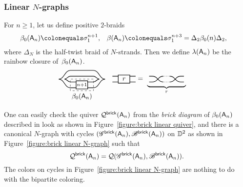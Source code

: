 \subsubsection{Linear \texorpdfstring{$N$-graphs}{N-graphs}}\label{sec:linear}
For $n\ge 1$, let us define positive $2$-braids
\begin{align*}
\beta_0(\dynA_n)&\colonequals \sigma_1^{n+1},&
\beta(\dynA_n) &\colonequals \sigma_1^{n+3} = \Delta_2 \beta_0(n) \Delta_2,
\end{align*}
where $\Delta_N$ is the half-twist braid of $N$-strands.
Then we define $\lambda(\mathsf{A}_n)$ be the rainbow closure of~$\beta_0(\mathsf{A}_n)$.
\begin{align*}
&\begin{tikzpicture}[baseline=-.5ex,scale=0.6]
\draw[thick] (-0.5,-0.25) -- (-1,-0.25) to[out=180,in=0] (-1.5,0) to[out=0,in=180] (-1,0.25) -- (1,0.25) to[out=0,in=180] (1.5,0) to[out=180,in=0] (1,-0.25) -- (0.5, -0.25);
\draw[thick] (-0.5,-0.75) -- (-1,-0.75) to[out=180,in=0] (-2,0) to[out=0,in=180] (-1,0.75) -- (1,0.75) to[out=0,in=180] (2,0) to[out=180,in=0] (1,-0.75) -- (0.5,-0.75);
\draw[thick] (-0.5,-0.85) rectangle (0.5,-0.15);
\draw (0,-0.5) node {$\scriptstyle n+1$};
\draw[dashed] (-1,-1) rectangle (1,0) (0,-1) node[below] {$\beta_0(\dynA_n)$};
\end{tikzpicture}&
\begin{tikzpicture}[baseline=-.5ex,scale=0.6]
\draw[thick] (-1.5,-0.25) -- (-1,-0.25) (-1.5,0.25) -- (-1,0.25) (0.5,-0.25) -- (0,-0.25) (0.5,0.25) -- (0,0.25) (-1,-0.35) rectangle node {$r$} (0,0.35);
\end{tikzpicture}&=
\begin{tikzpicture}[baseline=-.5ex,scale=0.6]
\draw[thick, rounded corners] (-1.5,0.25) -- (-1,0.25) -- (-0.5, -0.25) -- (-0.3, -0.25) (-1.5,-0.25) -- (-1,-0.25) -- (-0.5, 0.25) -- (-0.3, 0.25) (1.5,0.25) -- (1,0.25) -- (0.5, -0.25) -- (0.3, -0.25) (1.5,-0.25) -- (1,-0.25) -- (0.5, 0.25) -- (0.3, 0.25);
\draw[line cap=round, dotted] (-0.3,0.25) -- (0.3,0.25) (-0.3,-0.25) -- node[below] {$\underbrace{\hphantom{\hspace{2cm}}}_r$} (0.3,-0.25);
\end{tikzpicture}
\end{align*}

One can easily check the quiver $\mathcal{Q}^{\mathsf{brick}}(\mathsf{A}_n)$ from the \emph{brick diagram} of $\beta_0(\mathsf{A}_n)$ described in \cite{GSW2020b} look as shown in Figure~\ref{figure:brick linear quiver}, and there is a canonical $N$-graph with cycles $(\mathscr{G}^{\mathsf{brick}}(\mathsf{A}_n),\mathscr{B}^{\mathsf{brick}}(\mathsf{A}_n))$ on $\mathbb{D}^2$ as shown in Figure~\ref{figure:brick linear N-graph} such that 
\[
\mathcal{Q}^{\mathsf{brick}}(\mathsf{A}_n)=
\mathcal{Q}(\mathscr{G}^{\mathsf{brick}}(\mathsf{A}_n), \mathscr{B}^{\mathsf{brick}}(\mathsf{A}_n)).
\]
The colors on cycles in Figure~\ref{figure:brick linear N-graph} are nothing to do with the bipartite coloring.

